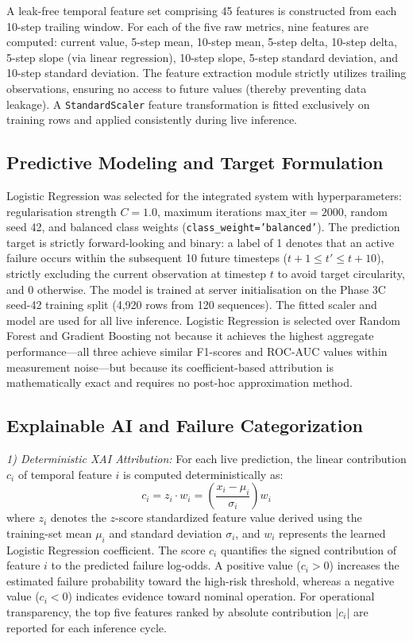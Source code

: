\documentclass[conference]{IEEEtran}
\begin{document}
A leak-free temporal feature set comprising 45 features is constructed from each 10-step trailing window. For each of the five raw metrics, nine features are computed: current value, 5-step mean, 10-step mean, 5-step delta, 10-step delta, 5-step slope (via linear regression), 10-step slope, 5-step standard deviation, and 10-step standard deviation. The feature extraction module strictly utilizes trailing observations, ensuring no access to future values (thereby preventing data leakage). A \texttt{StandardScaler} feature transformation is fitted exclusively on training rows and applied consistently during live inference.

\subsection{Predictive Modeling and Target Formulation}

Logistic Regression was selected for the integrated system with hyperparameters: regularisation strength $C = 1.0$, maximum iterations $\text{max\_iter} = 2000$, random seed 42, and balanced class weights (\texttt{class\_weight='balanced'}). The prediction target is strictly forward-looking and binary: a label of 1 denotes that an active failure occurs within the subsequent 10 future timesteps ($t+1 \le t' \le t+10$), strictly excluding the current observation at timestep $t$ to avoid target circularity, and 0 otherwise. The model is trained at server initialisation on the Phase 3C seed-42 training split (4,920 rows from 120 sequences). The fitted scaler and model are used for all live inference. Logistic Regression is selected over Random Forest and Gradient Boosting not because it achieves the highest aggregate performance---all three achieve similar F1-scores and ROC-AUC values within measurement noise---but because its coefficient-based attribution is mathematically exact and requires no post-hoc approximation method.

\subsection{Explainable AI and Failure Categorization}

\textit{1) Deterministic XAI Attribution:} For each live prediction, the linear contribution $c_i$ of temporal feature $i$ is computed deterministically as:
\begin{equation}
c_i = z_i \cdot w_i = \left(\frac{x_i - \mu_i}{\sigma_i}\right) w_i
\label{eq:attribution}
\end{equation}
where $z_i$ denotes the $z$-score standardized feature value derived using the training-set mean $\mu_i$ and standard deviation $\sigma_i$, and $w_i$ represents the learned Logistic Regression coefficient. The score $c_i$ quantifies the signed contribution of feature $i$ to the predicted failure log-odds. A positive value ($c_i > 0$) increases the estimated failure probability toward the high-risk threshold, whereas a negative value ($c_i < 0$) indicates evidence toward nominal operation. For operational transparency, the top five features ranked by absolute contribution $|c_i|$ are reported for each inference cycle.
\end{document}
